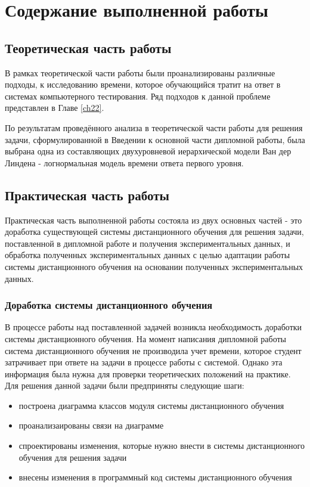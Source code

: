  \chapter{Содержание выполненной работы}

\section{Теоретическая часть работы}

В рамках теоретической части работы были проанализированы различные подходы, к исследованию времени, которое обучающийся тратит на ответ в системах компьютерного тестирования. Ряд подходов к данной проблеме  представлен в Главе \ref{ch22}. 

По результатам проведённого анализа в теоретической части работы для решения задачи, сформулированной в Введении к основной части дипломной работы, была выбрана одна из составляющих двухуровневой иерархической модели Ван дер Линдена - логнор\-мальная модель времени ответа первого уровня.

\section{Практическая часть работы}

Практическая часть выполненной работы состояла из двух основных час\-тей - это доработка существующей системы дистанционного обучения для решения задачи, постав\-ленной в дипломной работе и получения экспери\-ментальных данных, и обработка получен\-ных экспериментальных данных с целью адап\-тации работы системы дистанционного обуче\-ния на основании полученных экспериментальных данных.

\subsection{Доработка системы дистанционного обучения}

В процессе работы над поставленной задачей возникла необходимость доработки сис\-темы дистанционного обучения. На момент написания дип\-ломной работы система дистан\-ционного обучения не производила учет вре\-мени, которое студент затрачивает при ответе на задачи в процессе работы с сис\-темой. Однако эта информация была нужна для проверки теоретических положений на практике. Для решения данной задачи были предприняты следующие шаги:

\begin{itemize}
\item построена диаграмма классов модуля системы дистанционного обучения
\item проанализаированы связи на диаграмме
\item спроектированы изменения, которые нужно внести в системы дистан\-ционного обуче\-ния для решения задачи
\item внесены изменения в программный код системы дистанционного обу\-чения
\end{itemize}

